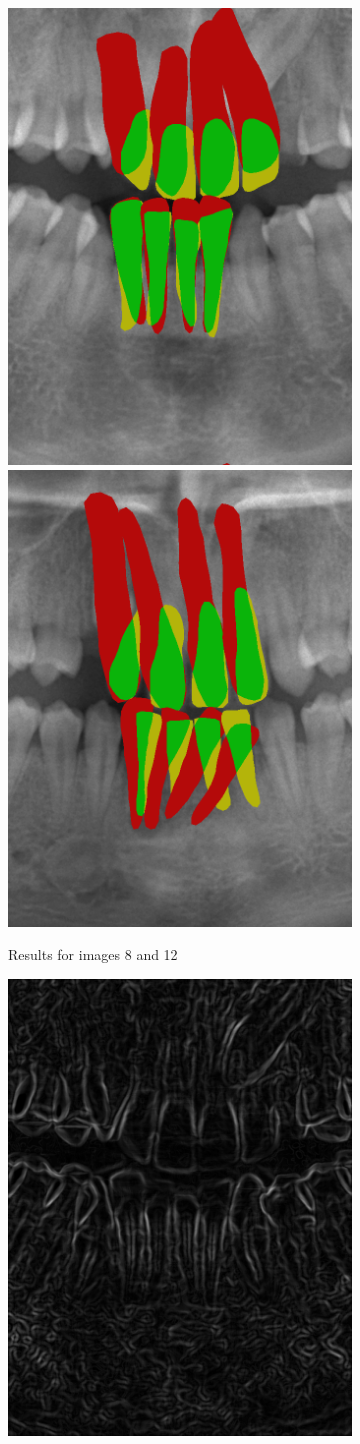 \documentclass[a4paper,titlepage,12pt]{article}
\begin{document}
\begin{figure}
	\begin{subfigure}{0.48\linewidth}
		\centering
		\includegraphics[width=0.48\columnwidth]{results/8i50}
		\includegraphics[width=0.48\columnwidth]{results/12i50}
		\caption{Results for images 8 and 12}
	\end{subfigure}
	\begin{subfigure}{0.48\linewidth}
		\centering
		\includegraphics[width=0.48\columnwidth]{results/8sobel}

\end{subfigure}
\end{figure}
\end{document}
